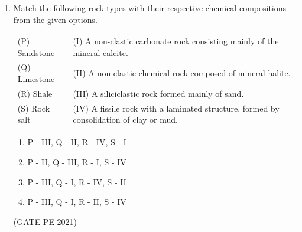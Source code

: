 \documentclass[journal,12pt,onecolumn]{IEEEtran}
\theoremstyle{remark}
\begin{document}
\begin{enumerate}
\item Match the following rock types with their respective chemical compositions from the given options.\\
\begin{tabular}{ll}
(P) Sandstone & (I) A non-clastic carbonate rock consisting mainly of the mineral calcite.\\
(Q) Limestone & (II) A non-clastic chemical rock composed of mineral halite.\\
(R) Shale & (III) A siliciclastic rock formed mainly of sand. \\
(S) Rock salt & (IV) A fissile rock with a laminated structure, formed by consolidation of clay or mud. \\
\end{tabular}
\begin{enumerate}
    \item P - III, Q - II, R - IV, S - I \\
    \item P - II, Q - III, R - I, S - IV \\
    \item P - III, Q - I, R - IV, S - II\\
    \item P - III, Q - I, R - II, S - IV
\end{enumerate}
\hfill{(GATE PE 2021)}


\end{enumerate}
\end{document}
